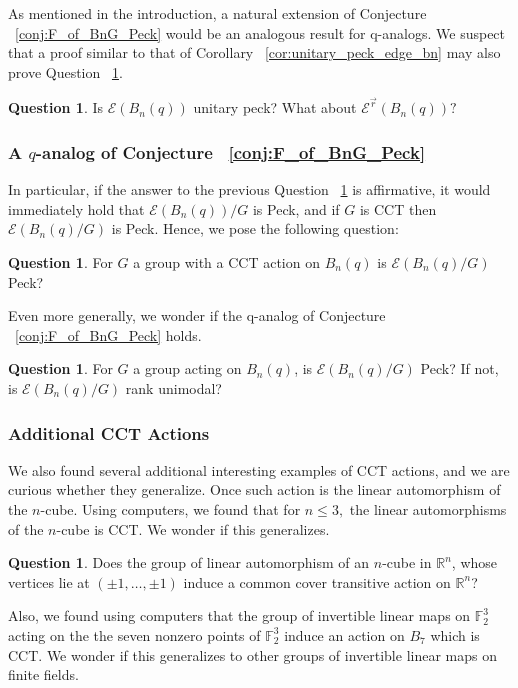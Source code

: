\documentclass[10 pt]{amsart}
\theoremstyle{plain}
\theoremstyle{definition}
\newtheorem{question}[thm]{Question}
\theoremstyle{remark}
\numberwithin{equation}{section}
\newcommand\sssec{\subsubsection}
\newcommand\BF{{\mathbb F}}
\newcommand\BR{{\mathbb R}}
\renewcommand{\vec}[1]{\overrightarrow{#1}}
\begin{document}
As mentioned in the introduction, a natural extension of Conjecture ~\ref{conj:F_of_BnG_Peck} would be an analogous result for q-analogs. We suspect that a proof similar to that of Corollary ~\ref{cor:unitary_peck_edge_bn} may also prove Question ~\ref{question:unitary_peck_q_edge}.

\begin{question}
\label{question:unitary_peck_q_edge}
Is $\mathcal E(B_n(q))$ unitary peck? What about $\mathcal E^{\vec r}(B_n(q))?$
\end{question}

\sssec{A $q$-analog of Conjecture ~\ref{conj:F_of_BnG_Peck}}

In particular, if the answer to the previous Question ~\ref{question:unitary_peck_q_edge} is affirmative, it would immediately hold that $\mathcal E(B_n(q))/G$ is Peck, and if $G$ is CCT then $\mathcal E(B_n(q)/G)$ is Peck. Hence, we pose the following question: 

\begin{question}
For $G$ a group with a CCT action on $B_n(q)$ is $\mathcal E(B_n(q)/G)$ Peck?
\end{question}

Even more generally, we wonder if the q-analog of Conjecture ~\ref{conj:F_of_BnG_Peck} holds.

\begin{question}
For $G$ a group acting on $B_n(q)$, is $\mathcal E(B_n(q)/G)$ Peck? If not, is $\mathcal E(B_n(q)/G)$ rank unimodal?
\end{question}

\sssec{Additional CCT Actions}

We also found several additional interesting examples of CCT actions, and we are curious whether they generalize. Once such action is the linear automorphism of the $n$-cube. Using computers, we found that for $n \leq 3,$ the linear automorphisms of the $n$-cube is CCT. We wonder if this generalizes.

\begin{question}
Does the group of linear automorphism of an $n$-cube in $\BR^n$, whose vertices lie at $(\pm 1, \ldots, \pm 1)$ induce a common cover transitive action on $\BR^n$?
\end{question}

Also, we found using computers that the group of invertible linear maps on $\BF_2^3$ acting on the the seven nonzero points of $\BF_2^3$ induce an action on $B_7$ which is CCT. We wonder if this generalizes to other groups of invertible linear maps on finite fields.
\end{document}
